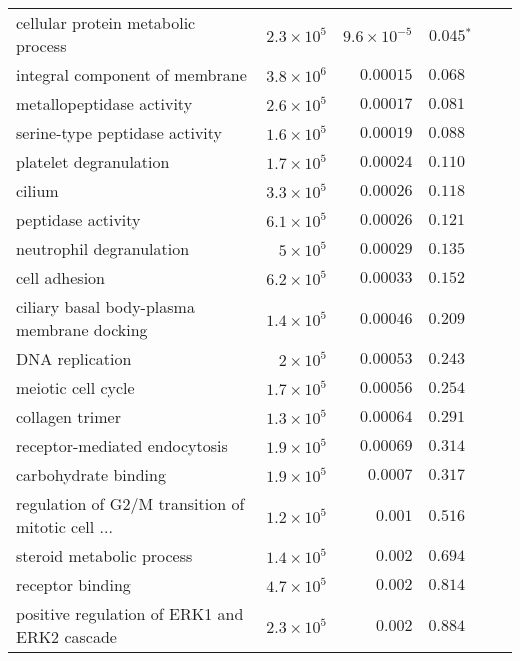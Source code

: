 \documentclass{article}
\begin{document}
\begin{longtable}{|l|r|r|r|r|r|}
                cellular protein metabolic process & $2.3\times 10^{5}$ &  $9.6\times 10^{-5}$ &              $\bm{ 0.045{^*}}$ \\
                    integral component of membrane & $3.8\times 10^{6}$ &            $0.00015$ &                     $ 0.068~~$ \\
                         metallopeptidase activity & $2.6\times 10^{5}$ &            $0.00017$ &                     $ 0.081~~$ \\
                    serine-type peptidase activity & $1.6\times 10^{5}$ &            $0.00019$ &                     $ 0.088~~$ \\
                            platelet degranulation & $1.7\times 10^{5}$ &            $0.00024$ &                     $ 0.110~~$ \\
                                            cilium & $3.3\times 10^{5}$ &            $0.00026$ &                     $ 0.118~~$ \\
                                peptidase activity & $6.1\times 10^{5}$ &            $0.00026$ &                     $ 0.121~~$ \\
                          neutrophil degranulation &  $ 5\times 10^{5}$ &            $0.00029$ &                     $ 0.135~~$ \\
                                     cell adhesion & $6.2\times 10^{5}$ &            $0.00033$ &                     $ 0.152~~$ \\
        ciliary basal body-plasma membrane docking & $1.4\times 10^{5}$ &            $0.00046$ &                     $ 0.209~~$ \\
                                   DNA replication &  $ 2\times 10^{5}$ &            $0.00053$ &                     $ 0.243~~$ \\
                                meiotic cell cycle & $1.7\times 10^{5}$ &            $0.00056$ &                     $ 0.254~~$ \\
                                   collagen trimer & $1.3\times 10^{5}$ &            $0.00064$ &                     $ 0.291~~$ \\
                     receptor-mediated endocytosis & $1.9\times 10^{5}$ &            $0.00069$ &                     $ 0.314~~$ \\
                              carbohydrate binding & $1.9\times 10^{5}$ &             $0.0007$ &                     $ 0.317~~$ \\
 regulation of G2/M transition of mitotic cell ... & $1.2\times 10^{5}$ &             $ 0.001$ &                     $ 0.516~~$ \\
                         steroid metabolic process & $1.4\times 10^{5}$ &             $ 0.002$ &                     $ 0.694~~$ \\
                                  receptor binding & $4.7\times 10^{5}$ &             $ 0.002$ &                     $ 0.814~~$ \\
      positive regulation of ERK1 and ERK2 cascade & $2.3\times 10^{5}$ &             $ 0.002$ &                     $ 0.884~~$ \\
\end{longtable}
\end{document}
